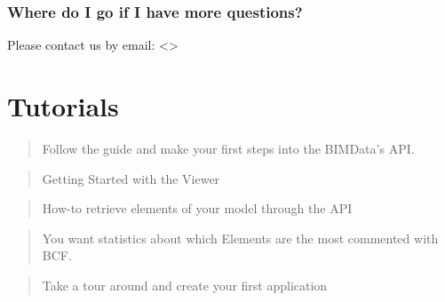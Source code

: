 \documentclass[a4paper,12pt,english]{sphinxmanual}
\begin{document}
\subsection{Where do I go if I have more questions?}
\label{\detokenize{guide/security:where-do-i-go-if-i-have-more-questions}}
Please contact us by email: \textless{}\textgreater{}


\chapter{Tutorials}
\label{\detokenize{tutorials/index:tutorials}}\label{\detokenize{tutorials/index::doc}}
\begin{sphinxShadowBox}
\begin{quote}

Follow the guide and make your first steps into the BIMData’s API.
\end{quote}
\end{sphinxShadowBox}

\begin{sphinxShadowBox}
\begin{quote}

Getting Started with the Viewer
\end{quote}
\end{sphinxShadowBox}

\begin{sphinxShadowBox}
\begin{quote}

How-to retrieve elements of your model through the API
\end{quote}
\end{sphinxShadowBox}

\begin{sphinxShadowBox}
\begin{quote}

You want statistics about which Elements are the most commented with BCF.
\end{quote}
\end{sphinxShadowBox}

\begin{sphinxShadowBox}
\begin{quote}

Take a tour around and create your first application
\end{quote}
\end{sphinxShadowBox}
\end{document}
